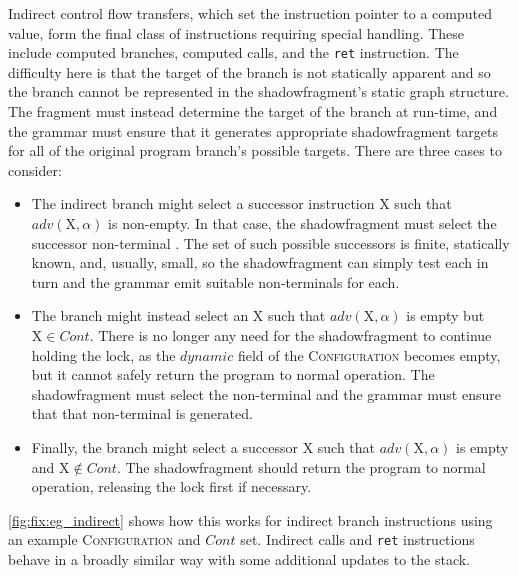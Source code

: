 Indirect control flow transfers, which set the instruction pointer to
a computed value, form the final class of instructions requiring
special handling.  These include computed branches, computed calls,
and the \texttt{ret} instruction.  The difficulty here is that the
target of the branch is not statically apparent and so the branch
cannot be represented in the \gls{shadowfragment}'s static graph
structure.  The fragment must instead determine the target of the
branch at run-time, and the grammar must ensure that it generates
appropriate \gls{shadowfragment} targets for all of the original
program branch's possible targets.  There are three cases to consider:
\begin{itemize}
\item The indirect branch might select a successor instruction X such
  that $\mathit{adv}(\textrm{X}, \alpha)$ is non-empty.  In that case,
  the \gls{shadowfragment} must select the successor non-terminal
  .  The set of such possible successors is finite,
  statically known, and, usually, small, so the \gls{shadowfragment}
  can simply test each in turn and the grammar emit suitable
  non-terminals for each.
\item The branch might instead select an X such that
  $\mathit{adv}(\textrm{X}, \alpha)$ is empty but $\mathrm{X} \in
  \mathit{Cont}$.  There is no longer any need for the
  \gls{shadowfragment} to continue holding the lock, as the
  $\mathit{dynamic}$ field of the \textsc{Configuration} becomes
  empty, but it cannot safely return the program to normal operation.
  The \gls{shadowfragment} must select the non-terminal  and the grammar must ensure
  that that non-terminal is generated.
\item Finally, the branch might select a successor X such that
  $\mathit{adv}(\textrm{X}, \alpha)$ is empty and $\mathrm{X} \not\in
  \mathit{Cont}$.  The \gls{shadowfragment} should return the program
  to normal operation, releasing the lock first if necessary.
\end{itemize}
\autoref{fig:fix:eg_indirect} shows how this works for indirect branch
instructions using an example \textsc{Configuration} and
$\mathit{Cont}$ set.  Indirect calls and \texttt{ret} instructions
behave in a broadly similar way with some additional updates to the
stack.

